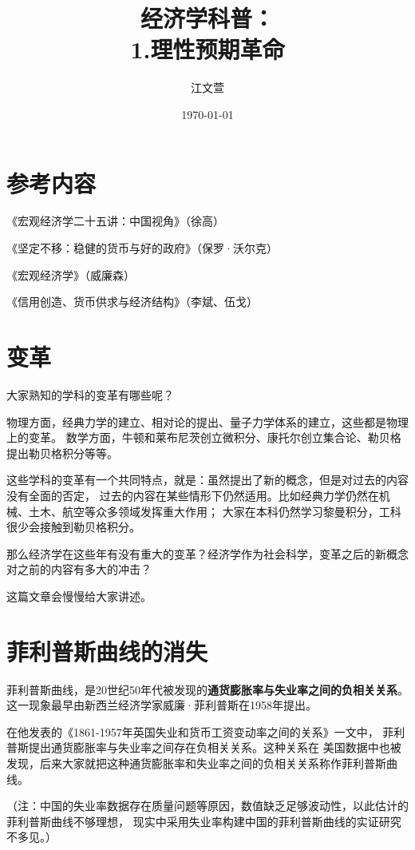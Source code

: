 \documentclass[UTF8]{article}
\title{经济学科普： \\ 1.理性预期革命}
\author{江文萱}
\date{\today}
\begin{document}
\maketitle

\section{参考内容}
    《宏观经济学二十五讲：中国视角》（徐高）\par
    《坚定不移：稳健的货币与好的政府》（保罗·沃尔克）\par
    《宏观经济学》（威廉森）\par
    《信用创造、货币供求与经济结构》（李斌、伍戈）

\section{变革}
    大家熟知的学科的变革有哪些呢？\par
    物理方面，经典力学的建立、相对论的提出、量子力学体系的建立，这些都是物理上的变革。
    数学方面，牛顿和莱布尼茨创立微积分、康托尔创立集合论、勒贝格提出勒贝格积分等等。\par
    这些学科的变革有一个共同特点，就是：虽然提出了新的概念，但是对过去的内容没有全面的否定，
    过去的内容在某些情形下仍然适用。比如经典力学仍然在机械、土木、航空等众多领域发挥重大作用；
    大家在本科仍然学习黎曼积分，工科很少会接触到勒贝格积分。\par
    那么经济学在这些年有没有重大的变革？经济学作为社会科学，变革之后的新概念对之前的内容有多大的冲击？\par
    这篇文章会慢慢给大家讲述。

\section{菲利普斯曲线的消失}
    菲利普斯曲线，是20世纪50年代被发现的\textbf{通货膨胀率与失业率之间的负相关关系}。
    这一现象最早由新西兰经济学家威廉·菲利普斯在1958年提出。\par
    在他发表的《1861-1957年英国失业和货币工资变动率之间的关系》一文中，
    菲利普斯提出通货膨胀率与失业率之间存在负相关关系。这种关系在
    美国数据中也被发现，后来大家就把这种通货膨胀率和失业率之间的负相关关系称作菲利普斯曲线。\par
    （注：中国的失业率数据存在质量问题等原因，数值缺乏足够波动性，以此估计的菲利普斯曲线不够理想，
    现实中采用失业率构建中国的菲利普斯曲线的实证研究不多见。）\par
    
\end{document}
